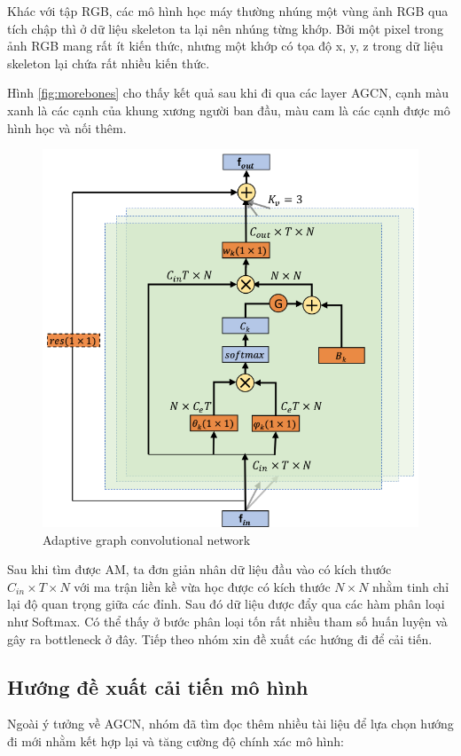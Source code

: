 Khác với tập RGB, các mô hình học máy thường nhúng một vùng ảnh RGB qua tích chập thì ở dữ liệu skeleton ta lại nên nhúng từng khớp. Bởi một pixel trong ảnh RGB mang rất ít kiến thức, nhưng một khớp có tọa độ x, y, z trong dữ liệu skeleton lại chứa rất nhiều kiến thức.

Hình \ref{fig:morebones} cho thấy kết quả sau khi đi qua các layer AGCN, cạnh màu xanh là các cạnh của khung xương người ban đầu, màu cam là các cạnh được mô hình học và nối thêm.

\begin{figure}[!htp]
    \begin{center}
        \includegraphics[width=0.6\linewidth]{asset/image/agcn.png}
        \caption{Adaptive graph convolutional network}
        \label{fig:agcn}
    \end{center}
\end{figure}

Sau khi tìm được AM, ta đơn giản nhân dữ liệu đầu vào có kích thước $C_{in} \times T \times N$ với ma trận liền kề vừa học được có kích thước $N \times N$ nhằm tinh chỉ lại độ quan trọng giữa các đỉnh. Sau đó dữ liệu được đẩy qua các hàm phân loại như Softmax. Có thể thấy ở bước phân loại tốn rất nhiều tham số huấn luyện và gây ra bottleneck ở đây. Tiếp theo nhóm xin đề xuất các hướng đi để cải tiến.

\subsection{Hướng đề xuất cải tiến mô hình}

Ngoài ý tưởng về AGCN, nhóm đã tìm đọc thêm nhiều tài liệu để lựa chọn hướng đi mới nhằm kết hợp lại và tăng cường độ chính xác mô hình:

